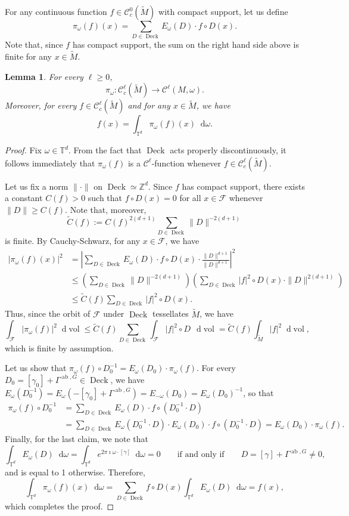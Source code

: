 \documentclass[11pt,letterpaper]{amsart}
\newcommand \cF {{\mathcal F}}
\newcommand \Z {{ \mathbb Z}}
\newcommand \T {{ \mathbb T}}
\newcommand \tM {{\widetilde M}}
\newcommand*{\diff}{\mathop{}\!\mathrm{d}}
\DeclareMathOperator{\vol}{vol}
\DeclareMathOperator{\Deck}{Deck}
\DeclareMathOperator{\abel}{ab}
\newtheorem {lemma}[theorem]{Lemma}
\theoremstyle{definition}
\begin{document}
For any continuous function $f \in \mathscr{C}^0_c(\tM)$ with compact support, let us define
\[
\pi_\omega(f)(x)= \sum_{D \in \Deck} E_\omega(D) \cdot f\circ D(x).
\]
Note that, since $f$ has compact support, the sum on the right hand side above is finite for any $x \in \tM$.
\begin{lemma}\label{lem:proj_cl}
For every $\ell \geq 0$, 
\[
\pi_\omega \colon \mathscr{C}^\ell_c(\tM) \to \mathscr{C}^\ell(M,\omega).
\]
Moreover, for every $f \in \mathscr{C}^\ell_c(\tM)$ and for any $x \in \tM$, we have
\[
f(x) = \int_{\T^d} \pi_\omega(f)(x) \diff \omega.
\]
\end{lemma}
\begin{proof}
Fix $\omega \in \T^d$. 
From the fact that $\Deck$ acts properly discontinuously, it follows immediately that $\pi_\omega(f)$ is a $\mathscr{C}^\ell$-function whenever $f \in \mathscr{C}^\ell_c(\tM)$.

Let us fix a norm $\| \cdot \|$ on $\Deck \simeq \Z^d$.
Since $f$ has compact support, there exists a constant $C(f)>0$ such that $f\circ D(x)=0$ for all $x \in \cF$ whenever $\|D\| \geq C(f)$. Note that, moreover, 
\[
\widetilde{C}(f) := C(f)^{2(d+1)} \sum_{D \in \Deck} \|D\|^{-2(d+1)} 
\]
is finite.
By Cauchy-Schwarz, for any $x \in \cF$, we have
\[
\begin{split}
|\pi_\omega(f)(x)|^2 &= \left\lvert \sum_{D \in \Deck} E_\omega(D) \cdot f\circ D(x) \cdot \frac{\|D\|^{d+1}}{\|D\|^{d+1}}\right\rvert^2 \\
&\leq \left(\sum_{D \in \Deck}\|D\|^{-2(d+1)} \right)\left(\sum_{D \in \Deck} |f|^2 \circ D(x) \cdot \|D\|^{2(d+1)}\right)\\
&\leq \widetilde{C}(f) \sum_{D \in \Deck} |f|^2 \circ D(x).
\end{split}
\]
Thus, since the orbit of $\cF$ under $\Deck$ tessellates $\tM$, we have
\[
\int_\cF |\pi_\omega(f)|^2 \diff \vol \leq \widetilde{C}(f) \sum_{D \in \Deck} \int_\cF |f|^2 \circ D \, \diff \vol = \widetilde{C}(f) \int_\tM |f|^2 \diff \vol,
\]
which is finite by assumption. 

Let us show that $\pi_\omega(f) \circ D_0^{-1} = E_\omega(D_0) \cdot \pi_\omega(f)$.
For every $D_0 = [\gamma_0] + \Gamma^{\abel,G} \in \Deck$, we have $E_\omega(D_0^{-1}) = E_\omega( -[\gamma_0] + \Gamma^{\abel, G}) = E_{-\omega}(D_0) = E_\omega(D_0)^{-1}$, so that 
\[
\begin{split}
\pi_\omega(f) \circ D_0^{-1} &= \sum_{D \in \Deck} E_\omega(D) \cdot f\circ (D_0^{-1} \cdot D ) \\
&= \sum_{D \in \Deck} E_\omega(D_0^{-1} \cdot D) \cdot  E_\omega(D_0) \cdot f\circ (D_0^{-1} \cdot D ) =E_\omega(D_0) \cdot \pi_\omega(f).
\end{split}
\]
Finally, for the last claim, we note that
\[
\int_{\T^d} E_\omega(D) \diff \omega = \int_{\T^d} e^{2 \pi \imath \omega \cdot [\gamma]} \diff \omega = 0 \qquad \text{if and only if} \qquad D = [\gamma] + \Gamma^{\abel, G} \neq 0,
\]
and is equal to 1 otherwise. Therefore,
\[
\int_{\T^d} \pi_\omega(f)(x) \diff \omega = \sum_{D \in \Deck}  f\circ D(x) \int_{\T^d} E_\omega(D) \diff \omega = f(x),
\]
which completes the proof.
\end{proof}
\end{document}
